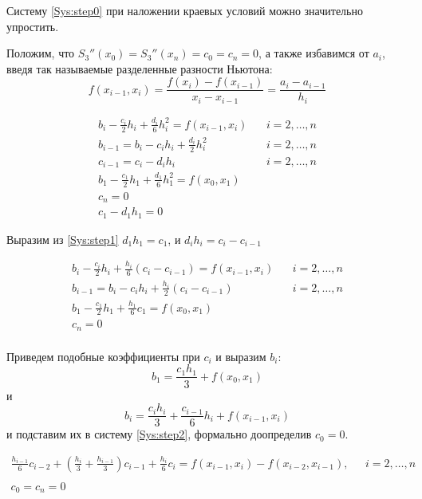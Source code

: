 Систему \eqref{Sys:step0} при наложении краевых условий можно значительно упростить.

Положим, что $S_3''(x_0) = S_3''(x_n) = c_0 = c_n = 0$, а также избавимся от $a_i$, введя так называемые разделенные разности Ньютона:
$$f(x_{i-1}, x_i) = \frac{f(x_i) - f(x_{i-1})}{x_i - x_{i-1}} = \frac{a_i - a_{i-1}}{h_i}$$

\begingroup
\Large
\begin{equation}
\begin{array}{lr}
     b_i - \frac{c_i}{2}h_i + \frac{d_i}{6}h_i^2= f(x_{i-1}, x_i)\ \ \ \  & i = 2,\dots, n  \\
     b_{i-1} = b_i - c_i h_i +\frac{d_i}{2}h_i^2 & i = 2,\dots, n  \\
     c_{i-1} = c_i - d_i h_i & i = 2,\dots, n  \\
     b_1 - \frac{c_1}{2} h_1 + \frac{d_1}{6} h_1^2 = f(x_0,x_1)
     & \\
     c_n = 0 & \\
     c_1 - d_1 h_1 = 0 &
\end{array}
\label{Sys:step1}
\end{equation}
\endgroup

Выразим из \eqref{Sys:step1} $d_1 h_1 = c_1$, и $d_i h_i = c_i - c_{i -1}$

\begingroup
\Large
\begin{equation}
\begin{array}{lr}
     b_i - \frac{c_i}{2}h_i + \frac{h_i}{6}(c_i - c_{i-1})= f(x_{i-1}, x_i)\ \ \ \  & i = 2,\dots, n  \\
     b_{i-1} = b_i - c_i h_i +\frac{h_i}{2}(c_i - c_{i-1}) & i = 2,\dots, n  \\
     b_1 - \frac{c_1}{2} h_1 + \frac{h_1}{6} c_1 = f(x_0,x_1)
     & \\
     c_n = 0 & \\
\end{array}
\label{Sys:step2}
\end{equation}
\endgroup

Приведем подобные коэффициенты при $c_i$ и выразим $b_i$: $$b_1 = \frac{c_1 h_1}{3} + f(x_0,x_1)$$ и $$b_i = \frac{c_i h_i}{3} + \frac{c_{i-1}}{6} h_i + f(x_{i-1}, x_i)$$ и подставим их в систему \eqref{Sys:step2}, формально доопределив $c_0 = 0$.

\begin{equation}
\begin{array}{lr}
    \frac{h_{i-1}}{6}c_{i-2} + (\frac{h_i}{3} + \frac{h_{i-1}}{3}) c_{i-1} + \frac{h_i}{6}c_i = f(x_{i-1},x_i) - f(x_{i-2}, x_{i-1}),\ \ \ & i = 2,\dots,n \\
    & \\
    c_0 = c_n = 0 &
\end{array}
\label{Sys:step3}
\end{equation}

